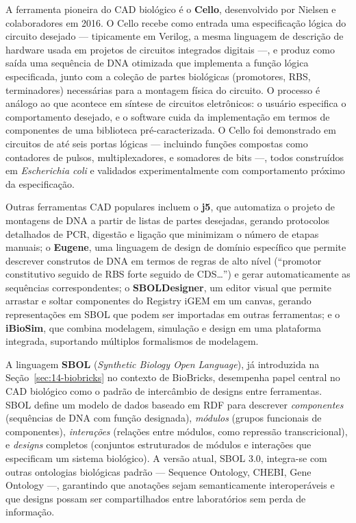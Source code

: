 A ferramenta pioneira do CAD biológico é o \textbf{Cello}, desenvolvido por Nielsen e colaboradores em 2016. O Cello recebe como entrada uma especificação lógica do circuito desejado --- tipicamente em Verilog, a mesma linguagem de descrição de hardware usada em projetos de circuitos integrados digitais ---, e produz como saída uma sequência de DNA otimizada que implementa a função lógica especificada, junto com a coleção de partes biológicas (promotores, RBS, terminadores) necessárias para a montagem física do circuito. O processo é análogo ao que acontece em síntese de circuitos eletrônicos: o usuário especifica o comportamento desejado, e o software cuida da implementação em termos de componentes de uma biblioteca pré-caracterizada. O Cello foi demonstrado em circuitos de até seis portas lógicas --- incluindo funções compostas como contadores de pulsos, multiplexadores, e somadores de bits ---, todos construídos em \textit{Escherichia coli} e validados experimentalmente com comportamento próximo da especificação.

Outras ferramentas CAD populares incluem o \textbf{j5}, que automatiza o projeto de montagens de DNA a partir de listas de partes desejadas, gerando protocolos detalhados de PCR, digestão e ligação que minimizam o número de etapas manuais; o \textbf{Eugene}, uma linguagem de design de domínio específico que permite descrever construtos de DNA em termos de regras de alto nível (``promotor constitutivo seguido de RBS forte seguido de CDS\ldots'') e gerar automaticamente as sequências correspondentes; o \textbf{SBOLDesigner}, um editor visual que permite arrastar e soltar componentes do Registry iGEM em um canvas, gerando representações em SBOL que podem ser importadas em outras ferramentas; e o \textbf{iBioSim}, que combina modelagem, simulação e design em uma plataforma integrada, suportando múltiplos formalismos de modelagem.

A linguagem \textbf{SBOL} (\emph{Synthetic Biology Open Language}), já introduzida na Seção~\ref{sec:14-biobricks} no contexto de BioBricks, desempenha papel central no CAD biológico como o padrão de intercâmbio de designs entre ferramentas. SBOL define um modelo de dados baseado em RDF para descrever \emph{componentes} (sequências de DNA com função designada), \emph{módulos} (grupos funcionais de componentes), \emph{interações} (relações entre módulos, como repressão transcricional), e \emph{designs} completos (conjuntos estruturados de módulos e interações que especificam um sistema biológico). A versão atual, SBOL 3.0, integra-se com outras ontologias biológicas padrão --- Sequence Ontology, CHEBI, Gene Ontology ---, garantindo que anotações sejam semanticamente interoperáveis e que designs possam ser compartilhados entre laboratórios sem perda de informação.

